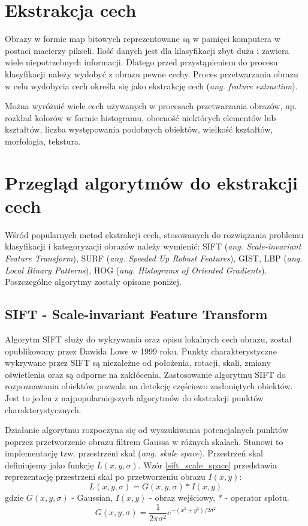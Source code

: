 \section{Ekstrakcja cech}

Obrazy w formie map bitowych reprezentowane są w pamięci komputera w postaci macierzy pikseli. Ilość danych jest dla klasyfikacji zbyt duża i zawiera wiele niepotrzebnych informacji. Dlatego przed przystąpieniem do procesu klasyfikacji należy wydobyć z obrazu pewne cechy. Proces przetwarzania obrazu w celu wydobycia cech określa się jako ekstrakcję cech (\emph{ang. feature extraction}).

Można wyróżnić wiele cech używanych w procesach przetwarzania obrazów, np. rozkład kolorów w formie histogramu, obecność niektórych elementów lub kształtów, liczba występowania podobnych obiektów, wielkość kształtów, morfologia, tekstura.

\section{Przegląd algorytmów do ekstrakcji cech}

Wśród popularnych metod ekstrakcji cech, stosowanych do rozwiązania problemu klasyfikacji i kategoryzacji obrazów należy wymienić: SIFT (\emph{ang. Scale-invariant Feature Transform})\cite{SIFT99}, SURF (\emph{ang. Speeded Up Robust Features}), GIST\cite{GIST09}, LBP (\emph{ang. Local Binary Patterns}), HOG (\emph{ang. Histograms of Oriented Gradients}). Poszczególne algorytmy zostały opisane poniżej.

\subsection{SIFT - Scale-invariant Feature Transform}

Algorytm SIFT służy do wykrywania oraz opisu lokalnych cech obrazu, został opublikowany przez Dawida Lowe w 1999 roku.\cite{SIFT99} Punkty charakterystyczne wykrywane przez SIFT są niezależne od położenia, rotacji, skali, zmiany oświetlenia oraz są odporne na zakłócenia. Zastosowanie algorytmu SIFT do rozpoznawania obiektów pozwala na detekcję częściowo zasłoniętych obiektów. Jest to jeden z najpopularniejszych algorytmów do ekstrakcji punktów charakterystycznych.

Działanie algorytmu rozpoczyna się od wyszukiwania potencjalnych punktów poprzez przetworzenie obrazu filtrem Gaussa w różnych skalach. Stanowi to implementację tzw. przestrzeni skal (\emph{ang. skale space}). Przestrzeń skal definiujemy jako funkcję $L(x, y, \sigma)$. Wzór \ref{sift_scale_space} przedstawia reprezentację przestrzeni skal po przetworzeniu obrazu $I(x, y)$:
\begin{equation} 
\label{sift_scale_space} 
L(x, y, \sigma) = G(x, y, \sigma) \ast I(x, y)
\end{equation} gdzie $G(x, y, \sigma)$ - Gaussian, $I(x, y)$ - obraz wejściowy, $\ast$ - operator splotu.
\begin{equation} 
\label{sift_gaussian} 
G(x, y, \sigma) = \frac{1}{2\pi\sigma^2}e^{-(x^2+y^2)/2\sigma^2}
\end{equation} 

